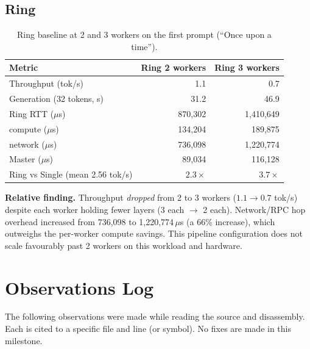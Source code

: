 \documentclass[11pt,a4paper]{article}
\begin{document}
\subsection{Ring}

\begin{table}[H]
\centering
\begin{tabular}{lrr}
\toprule
\textbf{Metric} & \textbf{Ring 2 workers} & \textbf{Ring 3 workers} \\
\midrule
Throughput (tok/s)          & 1.1 & 0.7 \\
Generation (32 tokens, s)   & 31.2 & 46.9 \\
Ring RTT ($\mu$s)           & 870,302 & 1,410,649 \\
compute ($\mu$s)            & 134,204 & 189,875 \\
network ($\mu$s)            & 736,098 & 1,220,774 \\
Master ($\mu$s)             & 89,034  & 116,128 \\
\midrule
Ring vs Single (mean 2.56 tok/s) & $2.3\times$ & $3.7\times$ \\
\bottomrule
\end{tabular}
\caption{Ring baseline at 2 and 3 workers on the first prompt (``Once upon a time'').}
\end{table}

\textbf{Relative finding.} Throughput \emph{dropped} from 2 to 3 workers ($1.1 \to 0.7$ tok/s) despite each worker holding fewer layers (3 each $\to$ 2 each). Network/RPC hop overhead increased from 736,098 to 1,220,774\,$\mu$s (a 66\% increase), which outweighs the per-worker compute savings. This pipeline configuration does not scale favourably past 2 workers on this workload and hardware.

\section{Observations Log}
\label{sec:obs}

The following observations were made while reading the source and disassembly. Each is cited to a specific file and line (or symbol). No fixes are made in this milestone.
\end{document}
